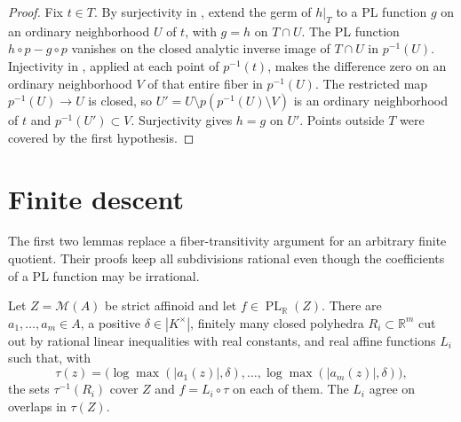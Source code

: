\documentclass[11pt,a4paper]{amsart}
\begin{document}
\begin{proof}
Fix $t\in T$. By surjectivity in , extend the germ of $h|_T$ to a PL function $g$ on an ordinary neighborhood $U$ of $t$, with $g=h$ on $T\cap U$. The PL function $h\circ p-g\circ p$ vanishes on the closed analytic inverse image of $T\cap U$ in $p^{-1}(U)$. Injectivity in , applied at each point of $p^{-1}(t)$, makes the difference zero on an ordinary neighborhood $V$ of that entire fiber in $p^{-1}(U)$. The restricted map $p^{-1}(U)\to U$ is closed, so $U'=U\setminus p(p^{-1}(U)\setminus V)$ is an ordinary neighborhood of $t$ and $p^{-1}(U')\subset V$. Surjectivity gives $h=g$ on $U'$. Points outside $T$ were covered by the first hypothesis.
\end{proof}

\section{Finite descent}\label{sec:finite-descent}

The first two lemmas replace a fiber-transitivity argument for an arbitrary finite quotient. Their proofs keep all subdivisions rational even though the coefficients of a PL function may be irrational.

\begin{lemma}\label{lem:bounded-tropical-presentation}
Let $Z=\mathcal M(A)$ be strict affinoid and let $f\in\operatorname{PL}_{\mathbb R}(Z)$. There are $a_1,\ldots,a_m\in A$, a positive $\delta\in|K^\times|$, finitely many closed polyhedra $R_i\subset\mathbb R^m$ cut out by rational linear inequalities with real constants, and real affine functions $L_i$ such that, with
\[
 \tau(z)=\bigl(\log\max(|a_1(z)|,\delta),\ldots,\log\max(|a_m(z)|,\delta)\bigr),
\]
the sets $\tau^{-1}(R_i)$ cover $Z$ and $f=L_i\circ\tau$ on each of them. The $L_i$ agree on overlaps in $\tau(Z)$.
\end{lemma}
\end{document}
